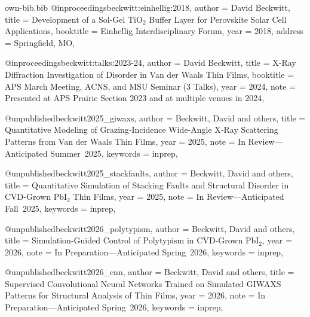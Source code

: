 \begin{filecontents*}{own-bib.bib}
@inproceedings{beckwitt:einhellig:2018,
  author    = {David Beckwitt},
  title     = {{Development of a Sol‑Gel {TiO}$_2$ Buffer Layer for Perovskite Solar Cell Applications}},
  booktitle = {Einhellig Interdisciplinary Forum},
  year      = {2018},
  address   = {Springfield, MO},
}

@inproceedings{beckwitt:talks:2023-24,
  author    = {David Beckwitt},
  title     = {{X‑Ray Diffraction Investigation of Disorder in {Van der Waals} Thin Films}},
  booktitle = {APS March Meeting, {ACNS}, and {MSU} Seminar (3 Talks)},
  year      = {2024},
  note      = {Presented at APS Prairie Section 2023 and at multiple venues in 2024},
}

@unpublished{beckwitt2025_giwaxs,
  author   = {Beckwitt, David and others},
  title    = {{Quantitative Modeling of Grazing‑Incidence Wide‑Angle X‑Ray Scattering Patterns from {Van der Waals} Thin Films}},
  year     = {2025},
  note     = {In Review—Anticipated Summer 2025},
  keywords = {inprep},
}

@unpublished{beckwitt2025_stackfaults,
  author   = {Beckwitt, David and others},
  title    = {{Quantitative Simulation of Stacking Faults and Structural Disorder in {CVD}‑Grown {PbI}$_2$ Thin Films}},
  year     = {2025},
  note     = {In Review—Anticipated Fall 2025},
  keywords = {inprep},
}

@unpublished{beckwitt2026_polytypism,
  author   = {Beckwitt, David and others},
  title    = {{Simulation‑Guided Control of Polytypism in {CVD}‑Grown {PbI}$_2$}},
  year     = {2026},
  note     = {In Preparation—Anticipated Spring 2026},
  keywords = {inprep},
}

@unpublished{beckwitt2026_cnn,
  author   = {Beckwitt, David and others},
  title    = {{Supervised Convolutional Neural Networks Trained on Simulated {GIWAXS} Patterns for Structural Analysis of Thin Films}},
  year     = {2026},
  note     = {In Preparation—Anticipated Spring 2026},
  keywords = {inprep},
}
\end{filecontents*}
\documentclass[a4paper,skipsamekey,11pt,english]{curve}
\makeatletter

\RequirePackage{silence}
\WarningsOff[longtable]
\WarningsOff[array]
\RequirePackage{array}

\usepackage{ifxetex,ifluatex}
\newif\ifxetexorluatex
\ifxetex
  \xetexorluatextrue
\else
  \ifluatex
    \xetexorluatextrue
  \else
    \xetexorluatexfalse
  \fi
\fi

